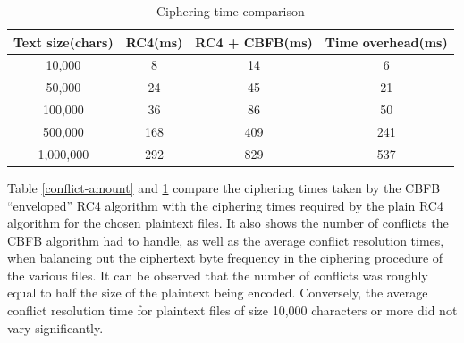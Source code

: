 \documentclass[conference]{IEEEtran}
\begin{document}
\begin{table}[!t]
\centering
\begin{tabular}{|c|c|c|c|}
\hline
Text size(chars) & RC4(ms) & RC4 + CBFB(ms) & Time overhead(ms) \\ \hline
10,000                                                      & 8        & 14  & 6                                                         \\ \hline
50,000                                                      & 24       & 45  & 21                                                          \\ \hline
100,000                                                     & 36       & 86  &  50                                                         \\ \hline
500,000                                                     & 168      & 409  &  241                                                        \\ \hline
1,000,000                                                   & 292      & 829  &  537                                                        \\ \hline
\end{tabular}
\caption{Ciphering time comparison}
\label{ciphering-time-comparison}
\end{table}

Table \ref{conflict-amount} and \ref{ciphering-time-comparison} compare the ciphering times taken by the CBFB “enveloped” RC4 algorithm with the ciphering times required by the plain RC4 algorithm for the chosen plaintext files. It also shows the number of conflicts the CBFB algorithm had to handle, as well as the average conflict resolution times, when balancing out the ciphertext byte frequency in the ciphering procedure of the various files. It can be observed that the number of conflicts was roughly equal to half the size of the plaintext being encoded. Conversely, the average conflict resolution time for plaintext files of size 10,000 characters or more did not vary significantly.
\end{document}
